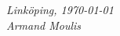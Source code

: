 \begin{acknowledgments}


  \addvspace{1em}
  \begin{flushright}
    \textit{%
      Linköping, \today \\
      Armand Moulis%
    }
  \end{flushright}
\end{acknowledgments}
